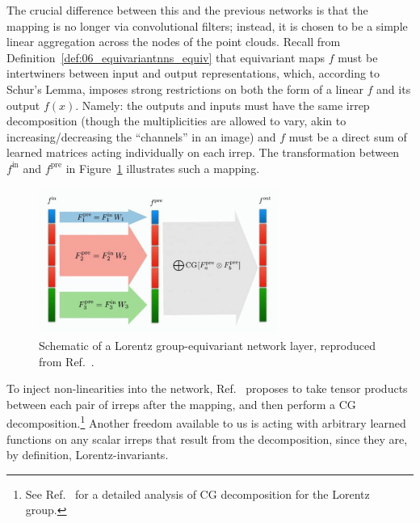 The crucial difference between this and the previous networks is that the mapping is no longer via convolutional filters; instead, it is chosen to be a simple linear aggregation across the nodes of the point clouds.
Recall from Definition~\ref{def:06_equivariantnns_equiv} that equivariant maps $f$ must be intertwiners between input and output representations, which, according to Schur's Lemma, imposes strong restrictions on both the form of a linear $f$ and its output $f(x)$. Namely: the outputs and inputs must have the same irrep decomposition (though the multiplicities are allowed to vary, akin to increasing/decreasing the ``channels'' in an image) and $f$ must be a direct sum of learned matrices acting individually on each irrep. The transformation between $f^{\mathrm{in}}$ and $f^{\mathrm{pre}}$ in Figure~\ref{fig:06_equivariantnns_equivneuron} illustrates such a mapping.

\begin{figure}[t]
    \centering
    \includegraphics[width=0.7\textwidth]{figures/06-ML4Jets/equivariantnns/equivneuron}
    \caption{Schematic of a Lorentz group-equivariant network layer, reproduced from Ref.~\cite{bogatskiy2020lorentz}.}
    \label{fig:06_equivariantnns_equivneuron}
\end{figure}

To inject non-linearities into the network, Ref.~\cite{bogatskiy2020lorentz} proposes to take tensor products between each pair of irreps after the mapping, and then perform a CG decomposition.\footnote{See Ref.~\cite{gelfand2018representations} for a detailed analysis of CG decomposition for the Lorentz group.}
Another freedom available to us is acting with arbitrary learned functions on any scalar irreps that result from the decomposition, since they are, by definition, Lorentz-invariants.


